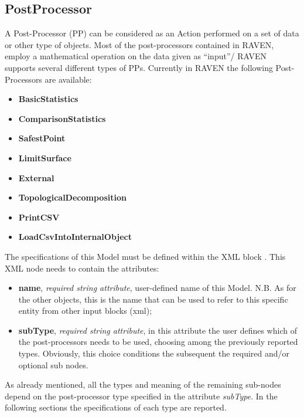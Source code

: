 \subsection{PostProcessor}
\label{sec:models_postProcessor}
A Post-Processor (PP) can be considered as an Action performed on a set of data
or other type of objects.
%
Most of the post-processors contained in RAVEN, employ a mathematical operation
on the data given as ``input''/
RAVEN supports several different types of PPs.
%
Currently in RAVEN the following Post-Processors are available:
\begin{itemize}
  \item \textbf{BasicStatistics}
  \item \textbf{ComparisonStatistics}
  \item \textbf{SafestPoint}
  \item \textbf{LimitSurface}
  \item \textbf{External}
  \item \textbf{TopologicalDecomposition}
  \item \textbf{PrintCSV}
  \item \textbf{LoadCsvIntoInternalObject}
\end{itemize}
The specifications of this Model must be defined within the XML block
.
%
This XML node needs to contain the attributes:
\vspace{-5mm}
\begin{itemize}
  \itemsep0em
  \item \textbf{name}, \textit{required string attribute}, user-defined name of
  this Model.
  N.B.
  As for the other objects, this is the name that can be used to refer to this
  specific entity from other input blocks (xml);
  \item \textbf{subType}, \textit{required string attribute}, in this attribute
  the user defines which of the post-processors needs to be used, choosing among
  the previously reported types.
  Obviously, this choice conditions the subsequent the required and/or optional
   sub nodes.
\end{itemize}
\vspace{-5mm}
As already mentioned, all the types and meaning of the remaining sub-nodes
depend on the post-processor type specified in the attribute \textit{subType}.
%
In the following sections the specifications of each type are reported.
%
